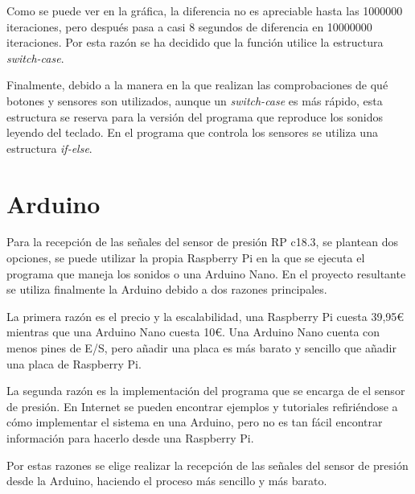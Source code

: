             Como se puede ver en la gráfica, la diferencia no es apreciable hasta las 1000000 iteraciones, pero después
            pasa a casi 8 segundos de diferencia en 10000000 iteraciones. Por esta razón se ha decidido que la función
            utilice la estructura \textit{switch-case}.\newline

            Finalmente, debido a la manera en la que realizan las comprobaciones de qué botones y sensores son
            utilizados, aunque un \textit{switch-case} es más rápido, esta estructura se reserva para la versión del
            programa que reproduce los sonidos leyendo del teclado. En el programa que controla los sensores se utiliza
            una estructura \textit{if-else}.



    \section{Arduino} %
    \label{sec:Arduino}

        Para la recepción de las señales del sensor de presión RP c18.3, se plantean dos opciones, se puede utilizar
        la propia Raspberry Pi en la que se ejecuta el programa que maneja los sonidos o una Arduino Nano. En el
        proyecto resultante se utiliza finalmente la Arduino debido a dos razones principales.\newline

        La primera razón es el precio y la escalabilidad, una Raspberry Pi cuesta 39,95\euro{} mientras que una
        Arduino Nano cuesta 10\euro{}. Una Arduino Nano cuenta con menos pines de E/S, pero añadir una placa es más
        barato y sencillo que añadir una placa de Raspberry Pi.\newline

        La segunda razón es la implementación del programa que se encarga de el sensor de presión. En Internet se
        pueden encontrar ejemplos y tutoriales refiriéndose a cómo implementar el sistema en una Arduino, pero no
        es tan fácil encontrar información para hacerlo desde una Raspberry Pi.\newline

        Por estas razones se elige realizar la recepción de las señales del sensor de presión desde la Arduino,
        haciendo el proceso más sencillo y más barato.


